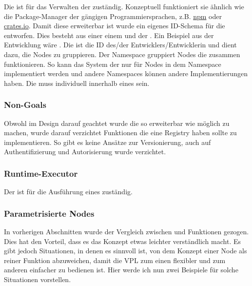 \documentclass[ngerman]{article}
\begin{document}
Die  ist für das Verwalten der  zuständig. Konzeptuell funktioniert sie ähnlich wie die Package-Manager der gängigen Programmiersprachen, z.B. \href{https://www.npmjs.com/}{npm} oder \href{https://crates.io/}{crates.io}.
\br
Damit diese  erweiterbar ist wurde ein eigenes ID-Schema für die  entworfen. Dies besteht aus einer  einem  und der . 
Ein Beispiel aus der Entwicklung wäre .
\br
Die  ist die ID des/der Entwicklers/Entwicklerin und dient dazu, die Nodes zu gruppieren. Der Namespace gruppiert Nodes die zusammen funktionieren. So kann das System der  nur für Nodes in dem  Namespace implementiert werden und andere Namespaces können andere Implementierungen haben.
\br
Die  muss individuell innerhalb eines  sein. 
\subsubsection*{Non-Goals}
Obwohl im Design darauf geachtet wurde die  so erweiterbar wie möglich zu machen, wurde darauf verzichtet Funktionen die eine  Registry haben sollte zu implementieren. So gibt es keine Ansätze zur Versionierung, auch auf Authentifizierung und Autorisierung wurde verzichtet.

\subsubsection{Runtime-Executor}
\label{sec:runtime_executor}

Der  ist für die Ausführung eines  zuständig.

\pagebreak

\subsubsection{Parametrisierte Nodes}
\label{sec:parameter_nodes}
In vorherigen Abschnitten wurde der Vergleich zwischen  und Funktionen gezogen. Dies hat den Vorteil, dass es das Konzept etwas leichter verständlich macht.
Es gibt jedoch Situationen, in denen es sinnvoll ist, von dem Konzept einer Node als reiner Funktion abzuweichen, damit die VPL zum einen flexibler und zum anderen einfacher zu bedienen ist. Hier werde ich nun zwei Beispiele für solche Situationen vorstellen.
\end{document}
